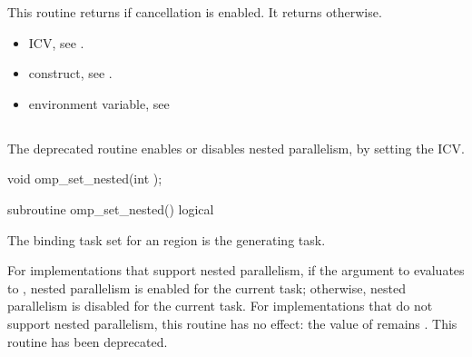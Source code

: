 \effect
This routine returns  if cancellation is enabled. It returns  otherwise.

\crossreferences
\begin{itemize}
\item {} ICV, see
.

\item {} construct, see .

\item {} environment variable, see
\end{itemize}









\subsection{}
\label{subsec:omp_set_nested}
\summary
The deprecated  routine enables or disables nested parallelism, by setting the
 ICV.


\format
\begin{ccppspecific}
\begin{ompcFunction}
void omp_set_nested(int );
\end{ompcFunction}
\end{ccppspecific}

\begin{fortranspecific}
\begin{ompfSubroutine}
subroutine omp_set_nested()
logical 
\end{ompfSubroutine}
\end{fortranspecific}

\binding
The binding task set for an  region is the generating task.

\effect
For implementations that support nested parallelism, if the argument to
 evaluates to , nested parallelism is enabled for the current task;
otherwise, nested parallelism is disabled for the current task. For implementations that
do not support nested parallelism, this routine has no effect: the value of 
remains . This routine has been deprecated.

